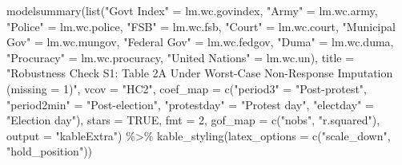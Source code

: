 \documentclass[
  letterpaper,
  DIV=11,
  numbers=noendperiod]{scrartcl}
\newenvironment{Shaded}{\begin{snugshade}}{\end{snugshade}}
\newcommand{\AttributeTok}[1]{\textcolor[rgb]{0.40,0.45,0.13}{#1}}
\newcommand{\ConstantTok}[1]{\textcolor[rgb]{0.56,0.35,0.01}{#1}}
\newcommand{\DecValTok}[1]{\textcolor[rgb]{0.68,0.00,0.00}{#1}}
\newcommand{\FunctionTok}[1]{\textcolor[rgb]{0.28,0.35,0.67}{#1}}
\newcommand{\NormalTok}[1]{\textcolor[rgb]{0.00,0.23,0.31}{#1}}
\newcommand{\OtherTok}[1]{\textcolor[rgb]{0.00,0.23,0.31}{#1}}
\newcommand{\SpecialCharTok}[1]{\textcolor[rgb]{0.37,0.37,0.37}{#1}}
\newcommand{\StringTok}[1]{\textcolor[rgb]{0.13,0.47,0.30}{#1}}
\begin{document}
\begin{Shaded}
\begin{Highlighting}[]
\FunctionTok{modelsummary}\NormalTok{(}\FunctionTok{list}\NormalTok{(}\StringTok{"Gov\textquotesingle{}t Index"} \OtherTok{=}\NormalTok{ lm.wc.govindex, }\StringTok{"Army"} \OtherTok{=}\NormalTok{ lm.wc.army, }\StringTok{"Police"} \OtherTok{=}\NormalTok{ lm.wc.police, }
                  \StringTok{"FSB"} \OtherTok{=}\NormalTok{ lm.wc.fsb, }\StringTok{"Court"} \OtherTok{=}\NormalTok{ lm.wc.court, }\StringTok{"Municipal Gov"} \OtherTok{=}\NormalTok{ lm.wc.mungov,}
                  \StringTok{"Federal Gov"} \OtherTok{=}\NormalTok{ lm.wc.fedgov, }\StringTok{"Duma"} \OtherTok{=}\NormalTok{ lm.wc.duma, }
                  \StringTok{"Procuracy"} \OtherTok{=}\NormalTok{ lm.wc.procuracy, }\StringTok{"United Nations"} \OtherTok{=}\NormalTok{ lm.wc.un),}
             \AttributeTok{title =} \StringTok{"Robustness Check S1: Table 2A Under Worst{-}Case Non{-}Response Imputation (missing = 1)"}\NormalTok{,}
             \AttributeTok{vcov =} \StringTok{"HC2"}\NormalTok{,}
             \AttributeTok{coef\_map =} \FunctionTok{c}\NormalTok{(}\StringTok{"period3"} \OtherTok{=} \StringTok{"Post{-}protest"}\NormalTok{, }
                          \StringTok{"period2min"} \OtherTok{=} \StringTok{"Post{-}election"}\NormalTok{, }
                          \StringTok{"protestday"} \OtherTok{=} \StringTok{"Protest day"}\NormalTok{, }
                          \StringTok{"electday"} \OtherTok{=} \StringTok{"Election day"}\NormalTok{),}
             \AttributeTok{stars =} \ConstantTok{TRUE}\NormalTok{, }\AttributeTok{fmt =} \DecValTok{2}\NormalTok{, }\AttributeTok{gof\_map =} \FunctionTok{c}\NormalTok{(}\StringTok{"nobs"}\NormalTok{, }\StringTok{"r.squared"}\NormalTok{),}
             \AttributeTok{output =} \StringTok{"kableExtra"}\NormalTok{) }\SpecialCharTok{\%\textgreater{}\%} 
   \FunctionTok{kable\_styling}\NormalTok{(}\AttributeTok{latex\_options =} \FunctionTok{c}\NormalTok{(}\StringTok{"scale\_down"}\NormalTok{, }\StringTok{"hold\_position"}\NormalTok{))}
\end{Highlighting}
\end{Shaded}
\end{document}
